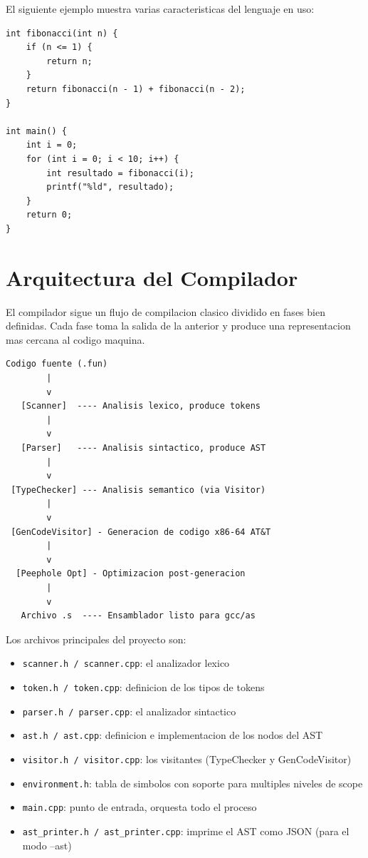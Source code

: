 \documentclass[12pt, a4paper]{article}
\begin{document}
El siguiente ejemplo muestra varias caracteristicas del lenguaje en uso:

\begin{lstlisting}[style=csstyle, caption={Ejemplo de programa CS\# con fibonacci}]
int fibonacci(int n) {
    if (n <= 1) {
        return n;
    }
    return fibonacci(n - 1) + fibonacci(n - 2);
}

int main() {
    int i = 0;
    for (int i = 0; i < 10; i++) {
        int resultado = fibonacci(i);
        printf("%ld", resultado);
    }
    return 0;
}
\end{lstlisting}

\newpage

\section{Arquitectura del Compilador}

El compilador sigue un flujo de compilacion clasico dividido en fases bien definidas. Cada fase toma la salida de la anterior y produce una representacion mas cercana al codigo maquina.

\begin{lstlisting}[style=grammarstyle, caption={Pipeline del compilador}]
Codigo fuente (.fun)
        |
        v
   [Scanner]  ---- Analisis lexico, produce tokens
        |
        v
   [Parser]   ---- Analisis sintactico, produce AST
        |
        v
 [TypeChecker] --- Analisis semantico (via Visitor)
        |
        v
 [GenCodeVisitor] - Generacion de codigo x86-64 AT&T
        |
        v
  [Peephole Opt] - Optimizacion post-generacion
        |
        v
   Archivo .s  ---- Ensamblador listo para gcc/as
\end{lstlisting}

Los archivos principales del proyecto son:

\begin{itemize}
    \item \texttt{scanner.h / scanner.cpp}: el analizador lexico
    \item \texttt{token.h / token.cpp}: definicion de los tipos de tokens
    \item \texttt{parser.h / parser.cpp}: el analizador sintactico
    \item \texttt{ast.h / ast.cpp}: definicion e implementacion de los nodos del AST
    \item \texttt{visitor.h / visitor.cpp}: los visitantes (TypeChecker y GenCodeVisitor)
    \item \texttt{environment.h}: tabla de simbolos con soporte para multiples niveles de scope
    \item \texttt{main.cpp}: punto de entrada, orquesta todo el proceso
    \item \texttt{ast\_printer.h / ast\_printer.cpp}: imprime el AST como JSON (para el modo --ast)
\end{itemize}
\end{document}
